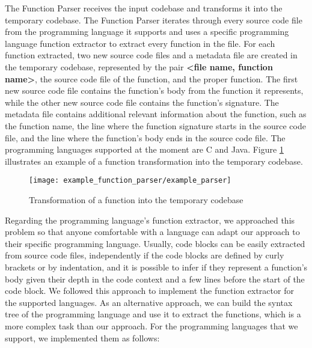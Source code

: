 The Function Parser receives the input codebase and transforms it into the temporary codebase. The Function Parser iterates through every source code file from the programming language it supports and uses a specific programming language function extractor to extract every function in the file. For each function extracted, two new source code files and a metadata file are created in the temporary codebase, represented by the pair \textbf{<file name, function name>}, the source code file of the function, and the proper function. The first new source code file contains the function's body from the function it represents, while the other new source code file contains the function's signature. The metadata file contains additional relevant information about the function, such as the function name, the line where the function signature starts in the source code file, and the line where the function's body ends in the source code file. The programming languages supported at the moment are C and Java. Figure \ref{fig:transform} illustrates an example of a function transformation into the temporary codebase.

\begin{figure}
\texttt{[image: example\_function\_parser/example\_parser]}
\caption{Transformation of a function into the temporary codebase}
\label{fig:transform}
\end{figure}

Regarding the programming language's function extractor, we approached this problem so that anyone comfortable with a language can adapt our approach to their specific programming language. Usually, code blocks can be easily extracted from source code files, independently if the code blocks are defined by curly brackets or by indentation, and it is possible to infer if they represent a function's body given their depth in the code context and a few lines before the start of the code block. We followed this approach to implement the function extractor for the supported languages. As an alternative approach, we can build the syntax tree \citep{compiler} of the programming language and use it to extract the functions, which is a more complex task than our approach. For the programming languages that we support, we implemented them as follows:

